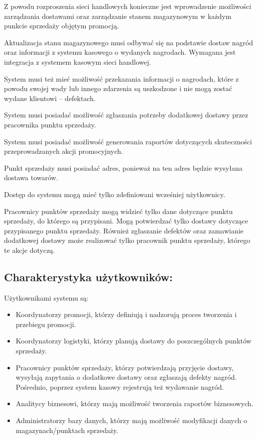 \documentclass[a4paper,12pt]{article}
\begin{document}
Z powodu rozproszenia sieci handlowych konieczne jest wprowadzenie możliwości zarządzania dostawami oraz zarządzanie stanem magazynowym w każdym punkcie sprzedaży objętym promocją.

Aktualizacja stanu magazynowego musi odbywać się na podstawie dostaw nagród oraz informacji z systemu kasowego o wydanych nagrodach.
Wymagana jest integracja z systemem kasowym sieci handlowej.

System musi też mieć możliwość przekazania informacji o nagrodach, które z powodu swojej wady lub innego zdarzenia są uszkodzone i nie mogą zostać wydane klientowi -- defektach.

System musi posiadać możliwość zgłaszania potrzeby dodatkowej dostawy przez pracownika punktu sprzedaży.

System musi posiadać możliwość generowania raportów dotyczących skuteczności przeprowadzanych akcji promocyjnych.

Punkt sprzedaży musi posiadać adres, ponieważ na ten adres będzie wysyłana dostawa towarów.

Dostęp do systemu mogą mieć tylko zdefiniowani wcześniej użytkownicy.

Pracownicy punktów sprzedaży mogą widzieć tylko dane dotyczące punktu sprzedaży, do którego są przypisani.
Mogą potwierdzać tylko dostawy dotyczące przypisanego punktu sprzedaży.
Również zgłaszanie defektów oraz zamawianie dodatkowej dostawy może realizować tylko pracownik punktu sprzedaży, którego te akcje dotyczą.

\subsection*{Charakterystyka użytkowników:}

Użytkownikami systemu są:
\begin{itemize}
    \item Koordynatorzy promocji, którzy definiują i nadzorują proces tworzenia i przebiegu promocji.
    \item Koordynatorzy logistyki, którzy planują dostawy do poszczególnych punktów sprzedaży.
    \item Pracownicy punktów sprzedaży, którzy potwierdzają przyjęcie dostawy, wysyłają zapytania o dodatkowe dostawy oraz zgłaszają defekty nagród. Pośrednio, poprzez system kasowy rejestrują też wydawanie nagród.
    \item Analitycy biznesowi, którzy mają możliwość tworzenia raportów biznesowych.
    \item Administratorzy bazy danych, którzy mają możliwość modyfikacji danych o magazynach/punktach sprzedaży.
\end{itemize}
\end{document}
